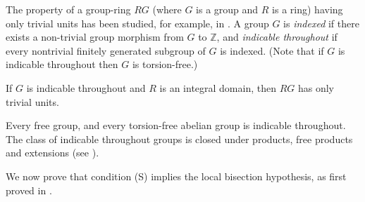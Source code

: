 The property of a group-ring $RG$ (where $G$ is a group and $R$ is a ring) having only trivial units has been studied, for example, in \cite{MR0002137}. A group $G$ is \emph{indexed} if there exists a non-trivial group morphism from $G$ to $\mathbb{Z}$, and \emph{indicable throughout} if every nontrivial finitely generated subgroup of $G$ is indexed. (Note that if $G$ is indicable throughout then $G$ is torsion-free.)

\begin{theorem}[{\cite[Theorem 13]{MR0002137}}]
If $G$ is indicable throughout and $R$ is an integral domain, then $RG$ has only trivial units.
\end{theorem}

Every free group, and every torsion-free abelian group is indicable throughout. The class of indicable throughout groups is closed under products, free products and extensions (see \cite{MR0002137}).

We now prove that condition (S) implies the local bisection hypothesis, as first proved in \cite[Lemma 3.5]{carlsenrout2017}.

